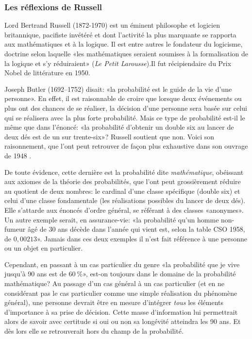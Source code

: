 \subsubsection{Les réflexions de Russell}

Lord Bertrand Russell (1872-1970) est un éminent philosophe et
logicien britannique, pacifiste invétéré et dont l'activité la plus
marquante se rapporta aux mathématiques et à la logique. Il est entre
autres le fondateur du logicisme, doctrine selon laquelle «les
mathématiques seraient soumises à la formalisation de la logique et
s'y réduiraient» (\emph{Le Petit Larousse}).Il fut récipiendaire du
Prix Nobel de littérature en 1950.

Joseph Butler (1692--1752) disait: «la probabilité est le guide de la
vie d'une personne».  En effet, il est raisonnable de croire que
lorsque deux événements ou plus ont des chances de se réaliser, la
décision d'une personne sera basée sur celui qui se réalisera avec la
plus forte probabilité. Mais ce type de probabilité est-il le même que
dans l'énoncé: «la probabilité d'obtenir un double six au lancer de
deux dés est de un sur trente-six»? Russell soutient que non. Voici
son raisonnement, que l'ont peut retrouver de façon plus exhaustive
dans son ouvrage de 1948 \citep{Russell:human:1948}.

De toute évidence, cette dernière est la probabilité dite
\emph{mathématique}, obéissant aux axiomes de la théorie des
probabilités, que l'ont peut grossièrement réduire au quotient de deux
nombres: le cardinal d'une classe spécifique (double six) et celui
d'une classe fondamentale (les réalisations possibles du lancer de
deux dés). Elle s'attarde aux énoncés d'ordre général, se référant à
des classes «anonymes». Un autre exemple serait, en assurance-vie: «la
probabilité qu'un homme non-fumeur âgé de 30 ans décède dans l'année
qui vient est, selon la table CSO 1958, de $0,00213$». Jamais dans ces
deux exemples il n'est fait référence à une personne ou un objet en
particulier.

Cependant, en passant à un cas particulier du genre «la probabilité
que je vive jusqu'à 90 ans est de $60~\%$», est-on toujours dans le
domaine de la probabilité mathématique? Au passage d'un cas général à
un cas particulier (et en ne considérant pas le cas particulier comme
une simple réalisation du phénomène général), une personne devrait
être en mesure d'intégrer \emph{tous} les éléments d'importance à sa
prise de décision. Cette masse d'information lui permettrait alors de
savoir avec certitude si oui ou non sa longévité atteindra les 90 ans.
Et dès lors elle se retrouverait hors du champ de la probabilité.

